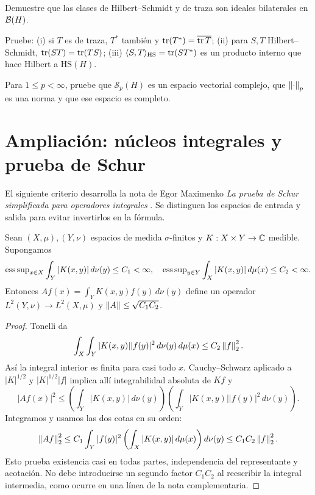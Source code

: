 \begin{ejercicio}\label{ej:v3-l12-4}
Demuestre que las clases de Hilbert--Schmidt y de traza son ideales bilaterales en $\mathcal B(H)$.
\end{ejercicio}


\begin{ejercicio}\label{ej:v3-l12-5}
Pruebe: (i) si $T$ es de traza, $T^*$ también y $\operatorname{tr}(T^*)=\overline{\operatorname{tr} T}$; (ii) para $S,T$ Hilbert--Schmidt, $\operatorname{tr}(ST)=\operatorname{tr}(TS)$; (iii) $\langle S,T\rangle_{\mathrm{HS}}=\operatorname{tr}(ST^*)$ es un producto interno que hace Hilbert a $\mathrm{HS}(H)$.
\end{ejercicio}


\begin{ejercicio}\label{ej:v3-l12-6}
Para $1\le p<\infty$, pruebe que $\mathcal S_p(H)$ es un espacio vectorial complejo, que $\left\lVert\cdot\right\rVert_p$ es una norma y que ese espacio es completo.
\end{ejercicio}


\section{Ampliación: núcleos integrales y prueba de Schur}
El siguiente criterio desarrolla la nota de Egor Maximenko \emph{La prueba de Schur simplificada para operadores integrales} \cite{maxschur}. Se distinguen los espacios de entrada y salida para evitar invertirlos en la fórmula.

\begin{teorema}\label{v3:schur}
Sean $(X,\mu),(Y,\nu)$ espacios de medida $\sigma$-finitos y $K:X\times Y\to\mathbb C$ medible. Supongamos
\[\operatorname{ess\,sup}_{x\in X}\int_Y|K(x,y)|\,d\nu(y)\le C_1<\infty,
\quad
\operatorname{ess\,sup}_{y\in Y}\int_X|K(x,y)|\,d\mu(x)\le C_2<\infty.
\]
Entonces $Af(x)=\int_YK(x,y)f(y)\,d\nu(y)$ define un operador $L^2(Y,\nu)\to L^2(X,\mu)$ y $\left\lVert A\right\rVert\le\sqrt{C_1C_2}$.
\end{teorema}
\begin{proof}
Tonelli da
\[\int_X\int_Y|K(x,y)||f(y)|^2\,d\nu(y)\,d\mu(x)
\le C_2\left\lVert f\right\rVert_2^2.
\]
Así la integral interior es finita para casi todo $x$. Cauchy--Schwarz aplicado a $|K|^{1/2}$ y $|K|^{1/2}|f|$ implica allí integrabilidad absoluta de $Kf$ y
\[|Af(x)|^2\le\left(\int_Y|K(x,y)|\,d\nu(y)\right)
\left(\int_Y|K(x,y)||f(y)|^2\,d\nu(y)\right).
\]
Integramos y usamos las dos cotas en su orden:
\[\left\lVert Af\right\rVert_2^2\le C_1\int_Y|f(y)|^2\left(\int_X|K(x,y)|\,d\mu(x)\right)d\nu(y)
\le C_1C_2\left\lVert f\right\rVert_2^2.
\]
Esto prueba existencia casi en todas partes, independencia del representante y acotación. No debe introducirse un segundo factor $C_1C_2$ al reescribir la integral intermedia, como ocurre en una línea de la nota complementaria.
\end{proof}

